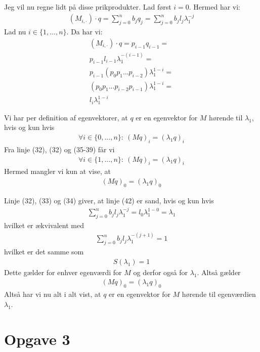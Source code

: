 \documentclass[12pt]{article}
\begin{document}
Jeg vil nu regne lidt på disse prikprodukter. Lad først $i=0$. Hermed har vi:
\begin{align}
(M_{i,\cdot})\cdot q = 
\sum_{j=0}^n b_j q_j = \sum_{j=0}^n b_jl_j\lambda_1^{-j}
\end{align}
Lad nu $i\in \{1,...,n\}$. Da har vi:
\begin{align}
(M_{i,\cdot})\cdot q = 
p_{i-1}q_{i-1} = \\ 
p_{i-1}l_{i-1}\lambda_1^{-(i-1)} = \\ 
p_{i-1}(p_0p_1...p_{i-2}) \lambda_1^{1-i} = \\
(p_0p_1...p_{i-2}p_{i-1}) \lambda_1^{1-i} = \\
l_i \lambda_1^{1-i}
\end{align}

Vi har per definition af egenvektorer, at $q$ er en egenvektor for $M$ hørende  til $\lambda_1$, hvis og kun hvis
\begin{align}
\forall i \in \{0,...,n\}:\  (Mq)_i = (\lambda_1q)_i
\end{align}
Fra linje (32), (32) og (35-39) får vi
\begin{align}
\forall i \in \{1,...,n\}:\  (Mq)_i = (\lambda_1q)_i
\end{align}
Hermed mangler vi kun at vise, at
\begin{align}
(Mq)_0 = (\lambda_1q)_0
\end{align}

Linje (32), (33) og (34) giver, at linje (42) er sand, hvis og kun hvis
\begin{align}
\sum_{j=0}^n b_jl_j\lambda_1^{-j} = l_{0}\lambda_1^{1-0} = \lambda_1
\end{align}
hvilket er ækvivalent med 
\begin{align}
\sum_{j=0}^n b_jl_j\lambda_1^{-(j+1)} = 1
\end{align}
hvilket er det samme som
\begin{align}
S(\lambda_1)=1
\end{align}
Dette gælder for enhver egenværdi for $M$ og derfor også for $\lambda_1$. Altså gælder
\begin{align}
(Mq)_0 = (\lambda_1q)_0
\end{align}
Altså har vi nu alt i alt vist, at $q$ er en egenvektor for $M$ hørende til egenværdien $\lambda_1$.

\section{Opgave 3}
\end{document}
